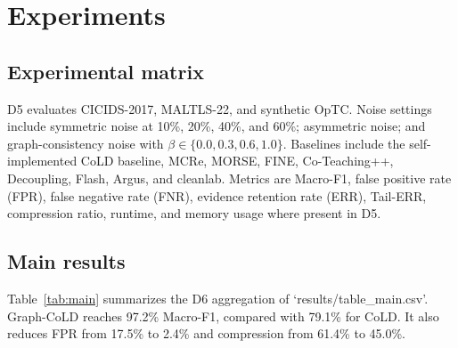 \documentclass[11pt]{article}
\begin{document}
\section{Experiments}
\subsection{Experimental matrix}
D5 evaluates CICIDS-2017, MALTLS-22, and synthetic OpTC. Noise settings include symmetric noise at 10\%, 20\%, 40\%, and 60\%; asymmetric noise; and graph-consistency noise with $\beta\in\{0.0,0.3,0.6,1.0\}$. Baselines include the self-implemented CoLD baseline, MCRe, MORSE, FINE, Co-Teaching++, Decoupling, Flash, Argus, and cleanlab. Metrics are Macro-F1, false positive rate (FPR), false negative rate (FNR), evidence retention rate (ERR), Tail-ERR, compression ratio, runtime, and memory usage where present in D5.

\subsection{Main results}
Table~\ref{tab:main} summarizes the D6 aggregation of `results/table\_main.csv'. Graph-CoLD reaches 97.2\% Macro-F1, compared with 79.1\% for CoLD. It also reduces FPR from 17.5\% to 2.4\% and compression from 61.4\% to 45.0\%.

\begin{table}[t]
\centering
\caption{Main D5 results aggregated for D6. Values are traceable to `tables/table\_1\_main\_results.csv'.}
\label{tab:main}
\end{table}
\end{document}
